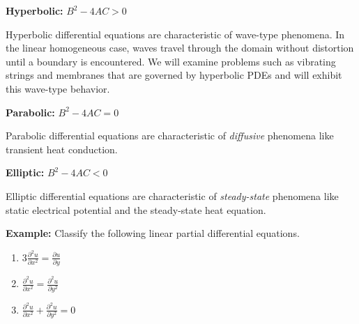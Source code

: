 \vspace{0.5cm}

\noindent\textbf{Hyperbolic:} $B^2 - 4AC > 0$ 

Hyperbolic differential equations are characteristic of wave-type phenomena.  In the linear homogeneous case, waves travel through the domain without distortion until a boundary is encountered.  We will examine problems such as vibrating strings and membranes that are governed by hyperbolic PDEs and will exhibit this wave-type behavior.

\vspace{0.5cm}

\noindent\textbf{Parabolic:} $B^2-4AC = 0$

Parabolic differential equations are characteristic of \emph{diffusive} phenomena like transient heat conduction.

\vspace{0.5cm}

\noindent\textbf{Elliptic:} $B^2-4AC < 0$

Elliptic differential equations are characteristic of \emph{steady-state} phenomena like static electrical potential and the steady-state heat equation.

\vspace{0.5cm}

\noindent\textbf{Example:}  Classify the following linear partial differential equations.

\begin{enumerate}
\item $3\frac{\partial^2 u}{\partial x^2} = \frac{\partial u}{\partial y} $

\vspace{0.5cm}

\item $\frac{\partial^2 u}{\partial x^2} = \frac{\partial^2 u}{\partial y^2}$

\vspace{0.5cm}

\item $\frac{\partial^2 u}{\partial x^2} + \frac{\partial^2 u}{\partial y^2} = 0$
\end{enumerate}

